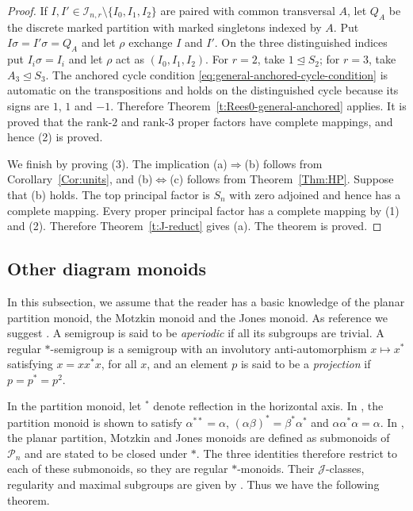 \documentclass[11pt]{article}
\theoremstyle{plain}
\theoremstyle{remark}
\theoremstyle{definition}
\theoremstyle{plain}
\begin{document}
\begin{proof}
 If $I,I' \in \mathcal I_{n,r} \setminus\{I_0,I_1,I_2\}$ are paired with common transversal $A$,
let $Q_A$ be the discrete marked partition with marked singletons indexed by
$A$. Put $I\sigma=I'\sigma=Q_A$ and let $\rho$ exchange $I$ and $I'$. On
the three distinguished indices put $I_i\sigma=I_i$ and let $\rho$ act as
$(I_0,I_1,I_2)$. For $r=2$, take $1\unlhd S_2$; for $r=3$, take
$A_3\unlhd S_3$. The anchored cycle condition {\eqref{eq:general-anchored-cycle-condition}}  is automatic on the
transpositions and holds on the distinguished cycle because its signs are
$1$, $1$ and $-1$. Therefore Theorem~\ref{t:Rees0-general-anchored} applies.
It is proved that the rank-$2$ and rank-$3$ proper factors have complete
mappings, and hence (2) is proved.

We finish by proving (3). The implication (a)$\Rightarrow$(b) follows from
Corollary~\ref{Cor:units}, and (b)$\Leftrightarrow$(c) follows from
Theorem~\ref{Thm:HP}. Suppose that (b) holds. The top principal factor is
$S_n$ with zero adjoined and hence has a complete mapping. Every proper
principal factor has a complete mapping by (1) and (2). Therefore
Theorem~\ref{t:J-reduct} gives (a). The theorem is proved.
\end{proof}

\subsection{Other diagram monoids}

{In this subsection, we assume that the reader has} a basic knowledge of the planar partition
monoid, the Motzkin monoid and the Jones monoid. As reference we suggest
\cite[Section~2.2]{EastMitchellRuskucTorpey}. A semigroup is said to be
\emph{aperiodic} if all its subgroups are trivial. A regular $*$-semigroup
is a semigroup with an involutory anti-automorphism $x\mapsto x^*$ satisfying
$x=xx^*x$, for all $x$, and an element $p$ is said to be a \emph{projection}
if $p=p^*=p^2$.

{In the partition monoid, let ${}^*$ denote reflection in the horizontal axis.} In \cite[Section~2.1]{EastMitchellRuskucTorpey}, 
the partition monoid is shown to satisfy
$\alpha^{**}=\alpha$, $(\alpha\beta)^*=\beta^*\alpha^*$ and
$\alpha\alpha^*\alpha=\alpha$. In
\cite[Section~2.2]{EastMitchellRuskucTorpey}, the planar partition,
Motzkin and Jones monoids are defined as submonoids of $\mathcal P_n$ and
are stated to be closed under $*$. The three identities therefore restrict
to each of these submonoids, so they are regular $*$-monoids. Their
$\mathcal J$-classes, regularity and maximal subgroups are given by
\cite[Proposition~2.1 and Remark~2.2(iv)--(vii)]
{EastMitchellRuskucTorpey}. Thus we have the following theorem.
\end{document}
